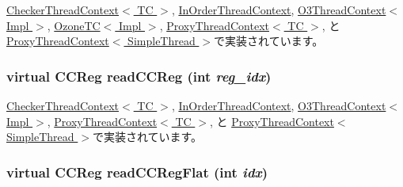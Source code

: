 \hyperlink{classCheckerThreadContext_aba547b904bdcf83196f983f79d285caf}{CheckerThreadContext$<$ TC $>$}, \hyperlink{classInOrderThreadContext_aba547b904bdcf83196f983f79d285caf}{InOrderThreadContext}, \hyperlink{classO3ThreadContext_aba547b904bdcf83196f983f79d285caf}{O3ThreadContext$<$ Impl $>$}, \hyperlink{classOzoneCPU_1_1OzoneTC_aba547b904bdcf83196f983f79d285caf}{OzoneTC$<$ Impl $>$}, \hyperlink{classProxyThreadContext_aba547b904bdcf83196f983f79d285caf}{ProxyThreadContext$<$ TC $>$}, と \hyperlink{classProxyThreadContext_aba547b904bdcf83196f983f79d285caf}{ProxyThreadContext$<$ SimpleThread $>$}で実装されています。\hypertarget{classThreadContext_af924a3ae757b2a311dd16bc8acde1c27}{
\subsubsection[{readCCReg}]{\setlength{\rightskip}{0pt plus 5cm}virtual {\bf CCReg} readCCReg (int {\em reg\_\-idx})}}
\label{classThreadContext_af924a3ae757b2a311dd16bc8acde1c27}


\hyperlink{classCheckerThreadContext_ac3d147c535052bfb1f8e8fe0697168d7}{CheckerThreadContext$<$ TC $>$}, \hyperlink{classInOrderThreadContext_ac3d147c535052bfb1f8e8fe0697168d7}{InOrderThreadContext}, \hyperlink{classO3ThreadContext_a490d3d7eda13841557ca14eb877f6236}{O3ThreadContext$<$ Impl $>$}, \hyperlink{classProxyThreadContext_ac3d147c535052bfb1f8e8fe0697168d7}{ProxyThreadContext$<$ TC $>$}, と \hyperlink{classProxyThreadContext_ac3d147c535052bfb1f8e8fe0697168d7}{ProxyThreadContext$<$ SimpleThread $>$}で実装されています。\hypertarget{classThreadContext_aa6d1af2db95563430c5ce31b38838a93}{
\subsubsection[{readCCRegFlat}]{\setlength{\rightskip}{0pt plus 5cm}virtual {\bf CCReg} readCCRegFlat (int {\em idx})}}
\label{classThreadContext_aa6d1af2db95563430c5ce31b38838a93}


